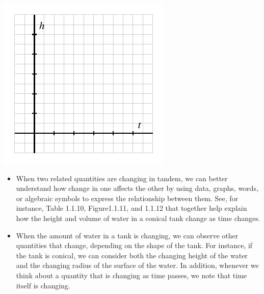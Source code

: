 \documentclass{ximera}
\begin{document}
\begin{exploration}
\begin{enumerate}[label=\alph*.]
\begin{image}
\includegraphics{tandem-h-t-blank-axes}
\end{image}

\end{enumerate}
\end{exploration}




\begin{summary}\begin{itemize}
\item When two related quantities are changing in tandem, we can better understand how change in one affects the other by using data, graphs, words, or algebraic symbols to express the relationship between them.  See, for instance, Table 1.1.10,  Figure1.1.11, and 1.1.12 that together help explain how the height and volume of water in a conical tank change as time changes.
\item When the amount of water in a tank is changing, we can observe other quantities that change, depending on the shape of the tank.  For instance, if the tank is conical, we can consider both the changing height of the water and the changing radius of the surface of the water.  In addition, whenever we think about a quantity that is changing as time passes, we note that time itself is changing.
\end{itemize}\end{summary}
\end{document}
